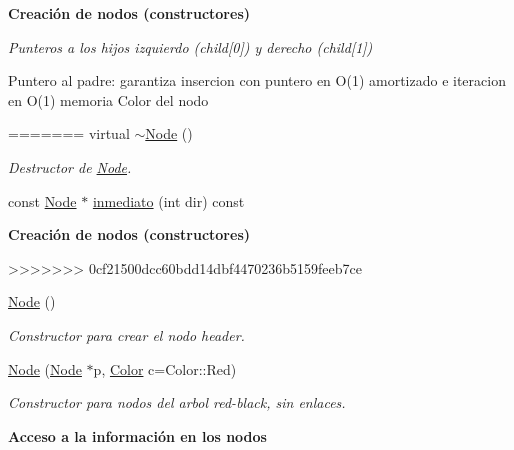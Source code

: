 \begin{Indent}{\bf \-Creación de nodos (constructores)}\par
{\em \-Punteros a los hijos izquierdo (child\mbox{[}0\mbox{]}) y derecho (child\mbox{[}1\mbox{]})

\-Puntero al padre\-: garantiza insercion con puntero en \-O(1) amortizado e iteracion en \-O(1) memoria \-Color del nodo }\begin{DoxyCompactItemize}
=======
virtual \hyperlink{structaed2_1_1map_1_1Node_a4f3cb2cc4302fe96432e624ced147540_a4f3cb2cc4302fe96432e624ced147540}{$\sim$\+Node} ()
\begin{DoxyCompactList}\small\item\em Destructor de \hyperlink{structaed2_1_1map_1_1Node}{Node}. \end{DoxyCompactList}\item 
const \hyperlink{structaed2_1_1map_1_1Node}{Node} $\ast$ \hyperlink{structaed2_1_1map_1_1Node_af812885685c8c3285136d444d5169b28_af812885685c8c3285136d444d5169b28}{inmediato} (int dir) const
\end{DoxyCompactItemize}
\begin{Indent}\textbf{ Creación de nodos (constructores)}\par
\begin{DoxyCompactItemize}
>>>>>>> 0cf21500dcc60bdd14dbf4470236b5159feeb7ce
\item 
\hyperlink{structaed2_1_1map_1_1Node_a9c1a600491066ce7eb669b1cb76d56c6_a9c1a600491066ce7eb669b1cb76d56c6}{Node} ()
\begin{DoxyCompactList}\small\item\em Constructor para crear el nodo header. \end{DoxyCompactList}\item 
\hyperlink{structaed2_1_1map_1_1Node_a62b5a42e88e219d53af8237a9ebedb6e_a62b5a42e88e219d53af8237a9ebedb6e}{Node} (\hyperlink{structaed2_1_1map_1_1Node}{Node} $\ast$p, \hyperlink{classaed2_1_1map_a6d62a415a4b9d320b30cada4ebcf9f5b_a6d62a415a4b9d320b30cada4ebcf9f5b}{Color} c=Color\+::\+Red)
\begin{DoxyCompactList}\small\item\em Constructor para nodos del arbol red-\/black, sin enlaces. \end{DoxyCompactList}\end{DoxyCompactItemize}
\end{Indent}
\begin{Indent}\textbf{ Acceso a la información en los nodos}\par

\end{Indent}
\end{Indent}
